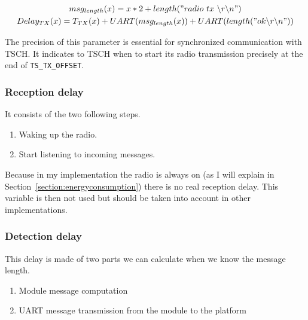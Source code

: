 \begin{gather}
  \label{eq:transmissiondelay}
  msg_{length}(x) = x * 2 + length("radio~tx~\backslash r \backslash n") \\
  Delay_{TX}(x) = T_{TX}(x) + UART(msg_{length}(x)) + UART(length("ok \backslash r\backslash n"))
\end{gather}

The precision of this parameter is essential for synchronized communication
with TSCH.
It indicates to TSCH when to start its radio transmission precisely at the
end of \lstinline{TS_TX_OFFSET}.

\subsubsection{Reception delay}

It consists of the two following steps.

\begin{enumerate}
  \item Waking up the radio.
  \item Start listening to incoming messages.
\end{enumerate}

Because in my implementation the radio is always on (as I will explain in
Section~\ref{section:energyconsumption}) there is no real reception
delay.
This variable is then not used but should be taken into account in other
implementations.

\subsubsection{Detection delay\label{section:detectiondelay}}


This delay is made of two parts we can calculate when we know the message
length.

\begin{enumerate}
  \item Module message computation
  \item UART message transmission from the module to the platform
\end{enumerate}

